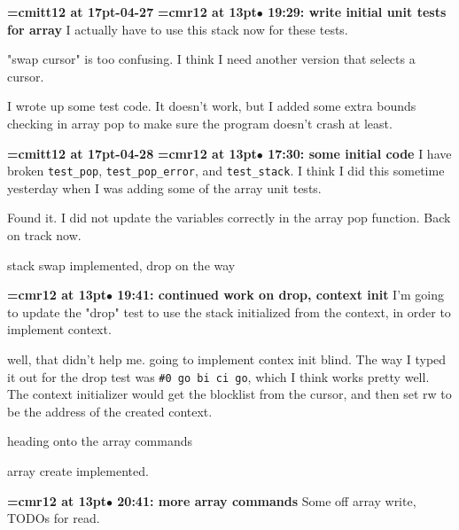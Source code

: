 {\medskip\noindent\bf\font\titlefont=cmitt12 at 17pt-04-27}\medskip
{\smallskip\noindent\bf\font\titlefont=cmr12 at 13pt\titlefont $\bullet$ 19:29: write initial unit tests for array}\smallskip
I actually have to use this stack now for these tests.
\par

"swap cursor" is too confusing. I think I need another version that selects a cursor.
\par

I wrote up some test code. It doesn't work, but I added some extra bounds checking in array pop to make sure the program doesn't crash at least.
\par

{\medskip\noindent\bf\font\titlefont=cmitt12 at 17pt-04-28}\medskip
{\smallskip\noindent\bf\font\titlefont=cmr12 at 13pt\titlefont $\bullet$ 17:30: some initial code}\smallskip
I have broken {\tt test\_pop}, {\tt test\_pop\_error}, and {\tt test\_stack}. I think I did this sometime yesterday when I was adding some of the array unit tests.
\par

Found it. I did not update the variables correctly in the array pop function. Back on track now.
\par

stack swap implemented, drop on the way
\par

{\smallskip\noindent\bf\font\titlefont=cmr12 at 13pt\titlefont $\bullet$ 19:41: continued work on drop, context init}\smallskip
I'm going to update the "drop" test to use the stack initialized from the context, in order to implement context.
\par

well, that didn't help me. going to implement contex init blind. The way I typed it out for the drop test was {\tt \#0 go bi ci go}, which I think works pretty well. The context initializer would get the blocklist from the cursor, and then set rw to be the address of the created context.
\par

heading onto the array commands
\par

array create implemented.
\par

{\smallskip\noindent\bf\font\titlefont=cmr12 at 13pt\titlefont $\bullet$ 20:41: more array commands}\smallskip
Some off array write, TODOs for read.
\par

